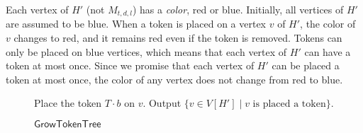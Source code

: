 \documentclass[runningheads]{llncs}
\theoremstyle{plain}
\theoremstyle{definition}
\begin{document}

Each vertex of $H'$ (not $M_{t, d, l}$) has a \emph{color}, red or blue. Initially, all vertices of $H'$ are assumed to be blue. When a token is placed on a vertex $v$ of $H'$, the color of $v$ changes to red, and it remains red even if the token is removed. Tokens can only be placed on blue vertices, which means that each vertex of $H'$ can have a token at most once. Since we promise that each vertex of $H'$ can be placed a token at most once, the color of any vertex does not change from red to blue.

\begin{comment}
\ifthenelse{\boolean{Draft}}{
\begin{figure}[t]
    \centering
    \texttt{[image: pic10.eps]}
    \caption{given $H$ with $d=2, l=2$ (left) and $t=1$, the construction of $H'$ (center) and $M_{t, d, l}$ (right). $H'$ is obtained by adding a complete directed $d$-ary tree (red part) connected to each root of $H$. Moreover, the labeling of $M_{t, d, l}$ is constructed recursively by appending one character to the right of the parent's label.}
    \label{fig:10}
\end{figure}
}
\end{comment}



\begin{figure}[!t]
\begin{algorithm}[H]
	\caption{$\mathsf{GrowTokenTree}$}
	\label{growtokentree}
	\begin{algorithmic}[1]
    \STATE Place the token $T \cdot b$ on $v$.
    \ENDWHILE
    \STATE Output $\{v \in V[H'] \mid v \text{ is placed a token}\}$.
	\end{algorithmic}
\end{algorithm}
\vspace{-1.5cm}
\end{figure}
\end{document}
